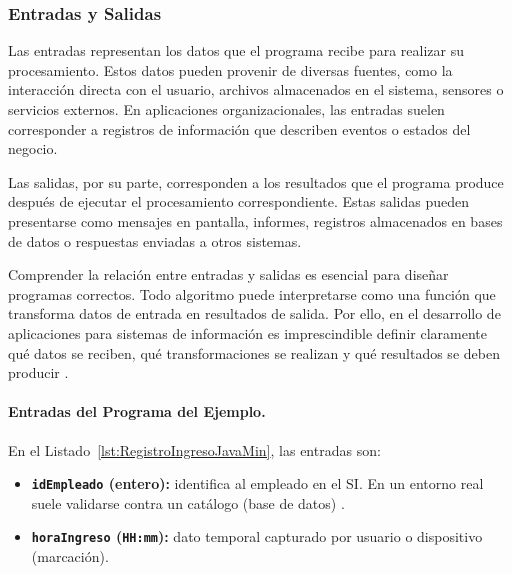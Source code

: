 \documentclass[12pt,twoside]{book}
\begin{document}
					\subsubsection{Entradas y Salidas}
						\noindent
						Las entradas representan los datos que el programa recibe para realizar su procesamiento. Estos datos pueden provenir de diversas fuentes, como la interacción directa con el usuario, archivos almacenados en el sistema, sensores o servicios externos. En aplicaciones organizacionales, las entradas suelen corresponder a registros de información que describen eventos o estados del negocio.
						
						Las salidas, por su parte, corresponden a los resultados que el programa produce después de ejecutar el procesamiento correspondiente. Estas salidas pueden presentarse como mensajes en pantalla, informes, registros almacenados en bases de datos o respuestas enviadas a otros sistemas.
						
						Comprender la relación entre entradas y salidas es esencial para diseñar programas correctos. Todo algoritmo puede interpretarse como una función que transforma datos de entrada en resultados de salida. Por ello, en el desarrollo de aplicaciones para sistemas de información es imprescindible definir claramente qué datos se reciben, qué transformaciones se realizan y qué resultados se deben producir \cite{Pressman2019Software,Laudon2020Management}.
						
						\paragraph{Entradas del Programa del Ejemplo.}
						En el Listado~\ref{lst:RegistroIngresoJavaMin}, las entradas son:
						\begin{itemize}
							\item \textbf{\texttt{idEmpleado} (entero):} identifica al empleado en el SI. En un entorno real suele validarse contra un catálogo (base de datos) \cite{Elmasri2016Database,Silberschatz2020Database}.
							\item \textbf{\texttt{horaIngreso} (\texttt{HH:mm}):} dato temporal capturado por usuario o dispositivo (marcación).
						\end{itemize}
						
\end{document}
